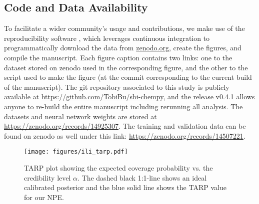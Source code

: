 \documentclass{aa}
\begin{document}
\begin{appendix}

\section{Code and Data Availability}
\label{sec:appendix_code_and_data}

To facilitate a wider community's usage and contributions, we make use of the reproducibility software
\href{https://github.com/showyourwork/showyourwork}{\showyourwork}
\citep{Luger2021}, which leverages continuous integration to
programmatically download the data from
\href{https://zenodo.org/}{zenodo.org}, create the figures, and
compile the manuscript. Each figure caption contains two links: one
to the dataset stored on zenodo used in the corresponding figure,
and the other to the script used to make the figure (at the commit
corresponding to the current build of the manuscript). The git
repository associated to this study is publicly available at
\url{https://github.com/TobiBu/sbi-chempy}, and the release
v0.4.1 allows anyone to re-build the entire manuscript including rerunning all analysis. The datasets and neural network weights are stored at \url{https://zenodo.org/records/14925307}. The training and validation data can be found on zenodo as well under this link: \url{https://zenodo.org/records/14507221}. 


\begin{figure}[]
     \centering
     \texttt{[image: figures/ili\_tarp.pdf]}
     \caption{TARP plot showing the expected coverage probability vs. the credibility level $\alpha$. The dashed black 1:1-line shows an ideal calibrated posterior and the blue solid line shows the TARP value for our NPE.}
     \label{fig:tarp}
\end{figure}


\end{appendix}
\end{document}
